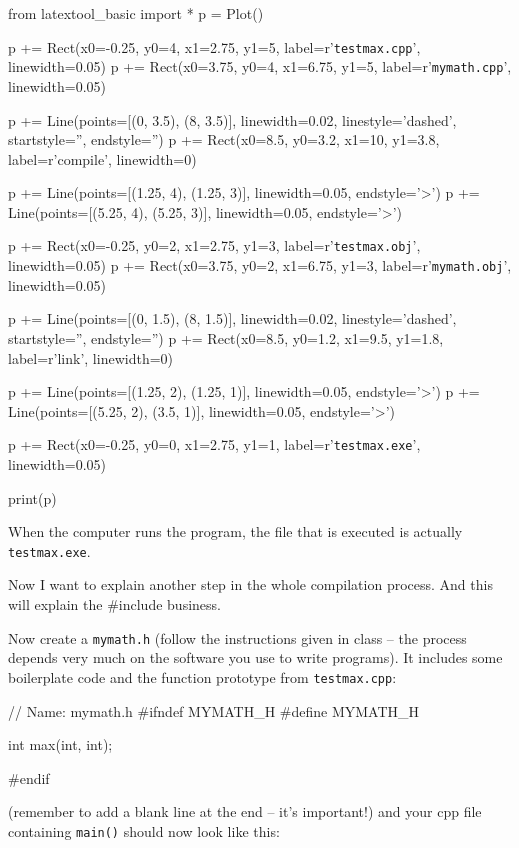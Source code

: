 \begin{python}
from latextool_basic import *
p = Plot()

p += Rect(x0=-0.25, y0=4, x1=2.75, y1=5, label=r'{\tt testmax.cpp}', linewidth=0.05)
p += Rect(x0=3.75, y0=4, x1=6.75, y1=5, label=r'{\tt mymath.cpp}', linewidth=0.05)

p += Line(points=[(0, 3.5), (8, 3.5)], linewidth=0.02, linestyle='dashed', startstyle='', endstyle='')
p += Rect(x0=8.5, y0=3.2, x1=10, y1=3.8, label=r'{\small compile}', linewidth=0)

p += Line(points=[(1.25, 4), (1.25, 3)], linewidth=0.05, endstyle='>')
p += Line(points=[(5.25, 4), (5.25, 3)], linewidth=0.05, endstyle='>')

p += Rect(x0=-0.25, y0=2, x1=2.75, y1=3, label=r'{\tt testmax.obj}', linewidth=0.05)
p += Rect(x0=3.75, y0=2, x1=6.75, y1=3, label=r'{\tt mymath.obj}', linewidth=0.05)

p += Line(points=[(0, 1.5), (8, 1.5)], linewidth=0.02, linestyle='dashed', startstyle='', endstyle='')
p += Rect(x0=8.5, y0=1.2, x1=9.5, y1=1.8, label=r'{\small link}', linewidth=0)

p += Line(points=[(1.25, 2), (1.25, 1)], linewidth=0.05, endstyle='>')
p += Line(points=[(5.25, 2), (3.5, 1)], linewidth=0.05, endstyle='>')

p += Rect(x0=-0.25, y0=0, x1=2.75, y1=1, label=r'{\tt testmax.exe}', linewidth=0.05)

print(p)
\end{python}

When the computer runs the program, the file that is executed is
actually \texttt{testmax.exe}.

Now I want to explain another step in the whole compilation process. And
this will explain the \#include business.

Now create a  \texttt{mymath.h} (follow the
instructions given in class -- the process depends very much on the
software you use to write programs). It includes some boilerplate code
and the function prototype from \texttt{testmax.cpp}:

\begin{consolethree}[escapeinside=||]
// Name: mymath.h
#ifndef MYMATH_H
#define MYMATH_H

int max(int, int);

#endif
\end{consolethree}

(remember to add a blank line at the end -- it's important!) and your cpp
file containing \texttt{main()} should now look like this:

